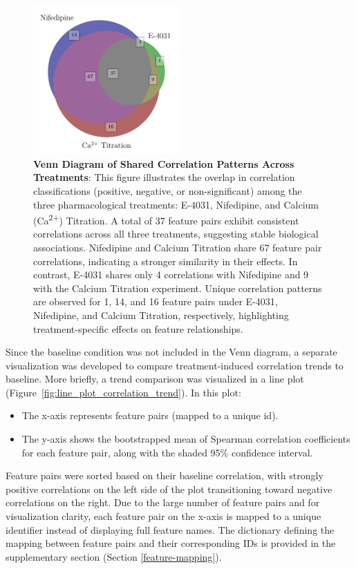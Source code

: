 \documentclass{report}
\begin{document}
    \begin{figure}[H]
        \centering
        \includegraphics[width=0.5\textwidth, keepaspectratio]{plots/chapter_7/correlation_venn.pdf}
         \caption[Venn Diagram of Shared Correlation Patterns Across Treatments]{\textbf{Venn Diagram of Shared Correlation Patterns Across Treatments}:
            This figure illustrates the overlap in correlation classifications (positive, negative, or non-significant) among the three pharmacological treatments: E-4031, Nifedipine, and Calcium (Ca\textsuperscript{2+}) Titration. 
            A total of 37 feature pairs exhibit consistent correlations across all three treatments, suggesting stable biological associations. Nifedipine and Calcium Titration share 67 feature pair correlations, indicating a stronger similarity in their effects. In contrast, E-4031 shares only 4 correlations with Nifedipine and 9 with the Calcium Titration experiment. Unique correlation patterns are observed for 1, 14, and 16 feature pairs under E-4031, Nifedipine, and Calcium Titration, respectively, highlighting treatment-specific effects on feature relationships.}
        \label{fig:correlation_venn}
    \end{figure}

    
    Since the baseline condition was not included in the Venn diagram, a separate visualization was developed to compare treatment-induced correlation trends to baseline. More briefly, a trend comparison was visualized in a line plot (Figure~\ref{fig:line_plot_correlation_trend}). In this plot:
    \begin{itemize}
        \item The x-axis represents feature pairs (mapped to a unique id).
        \item The y-axis shows the bootstrapped mean of Spearman correlation coefficients for each feature pair, along with the shaded 95\% confidence interval.
    \end{itemize}
    Feature pairs were sorted based on their baseline correlation, with strongly positive correlations on the left side of the plot transitioning toward negative correlations on the right. Due to the large number of feature pairs and for visualization clarity, each feature pair on the x-axis is mapped to a unique identifier instead of displaying full feature names. The dictionary defining the mapping between feature pairs and their corresponding IDs is provided in the supplementary section (Section \ref{feature-mapping}).
    
\end{document}
